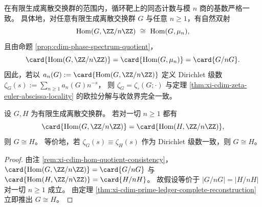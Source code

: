 \begin{remark}\label{rem:xi-cdim-hom-quotient-consistency}
在有限生成离散交换群的范围内，循环靶上的同态计数与模 \(n\) 商的基数严格一致。
具体地，对任意有限生成离散交换群 \(G\) 与任意 \(n\ge 1\)，有自然双射
\[
\operatorname{Hom}(G,\ZZ/n\ZZ)\ \cong\ \operatorname{Hom}(G,\mu_n),
\]
且由命题 \ref{prop:cdim-phase-spectrum-quotient}，
\[
\card{\operatorname{Hom}(G,\ZZ/n\ZZ)}=\card{\operatorname{Hom}(G,\mu_n)}=\card{G/nG}.
\]
因此，若以
\(
a_n(G):=\card{\operatorname{Hom}(G,\ZZ/n\ZZ)}
\)
定义 Dirichlet 级数
\(
\zeta_G(s):=\sum_{n\ge 1}a_n(G)n^{-s}
\)，
则 \(\zeta_G=\zeta_{\circ}(G;\cdot)\) 与定理 \ref{thm:xi-cdim-zeta-euler-abscissa-locality} 的欧拉分解与收敛界完全一致。
\end{remark}

\begin{corollary}\label{cor:xi-cdim-zeta-fingerprint-rigidity}
设 \(G,H\) 为有限生成离散交换群。
若对一切 \(n\ge 1\) 都有
\[
\card{\operatorname{Hom}(G,\ZZ/n\ZZ)}=\card{\operatorname{Hom}(H,\ZZ/n\ZZ)},
\]
则 \(G\cong H\)。
等价地，若 \(\zeta_G(s)\equiv \zeta_H(s)\) 作为 Dirichlet 级数一致，则 \(G\cong H\)。
\end{corollary}
\begin{proof}
由注 \ref{rem:xi-cdim-hom-quotient-consistency}，
\(
\card{\operatorname{Hom}(G,\ZZ/n\ZZ)}=\card{G/nG}
\)
与
\(
\card{\operatorname{Hom}(H,\ZZ/n\ZZ)}=\card{H/nH}
\)。
故假设等价于 \(|G/nG|=|H/nH|\) 对一切 \(n\ge 1\) 成立。
由定理 \ref{thm:xi-cdim-prime-ledger-complete-reconstruction} 立即推出 \(G\cong H\)。
\end{proof}

